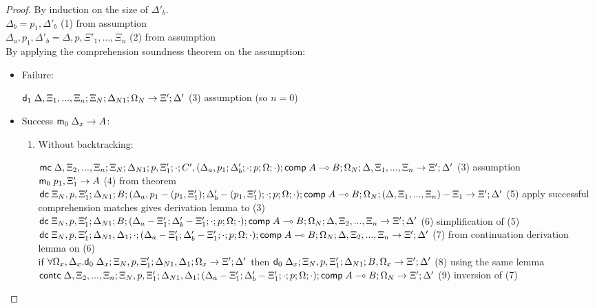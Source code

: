 \begin{proof}
   By induction on the size of $\Delta'_b$.\\

   $\Delta_b = p_1, \Delta'_b$ \hfill (1) from assumption \\
   $\Delta_a, p_1, \Delta'_b = \Delta, p, \Xi'_1, ..., \Xi_n$ \hfill (2) from assumption \\
   By applying the comprehension soundness theorem on the assumption:\\
      
   \begin{itemize}
      \item Failure:
         
      $\mathsf{d}_1 \; \Delta, \Xi_1, ..., \Xi_n; \Xi_N; \Delta_{N1}; \Omega_N \rightarrow \Xi'; \Delta'$ \hfill (3) assumption (so $n = 0$)\\
         
      \item Success $\mathsf{m}_0 \; \Delta_x \rightarrow A$:
      
      \begin{enumerate}
         
         \item Without backtracking:
         
         $\mathsf{mc} \; \Delta, \Xi_2, ..., \Xi_n; \Xi_N; \Delta_{N1}; p, \Xi'_1; \cdot; C', (\Delta_a, p_1; \Delta'_b; \cdot; p; \Omega; \cdot); \mathsf{comp} \; A \multimap B; \Omega_N; \Delta, \Xi_1, ..., \Xi_n \rightarrow \Xi'; \Delta'$ \hfill (3) assumption \\
         $\mathsf{m}_0 \; p_1, \Xi'_1 \rightarrow A$ \hfill (4) from theorem\\
         $\mathsf{dc} \; \Xi_N, p, \Xi'_1; \Delta_{N1}; B; (\Delta_a, p_1 - (p_1, \Xi'_1); \Delta'_b - (p_1, \Xi'_1); \cdot; p; \Omega; \cdot); \mathsf{comp} \; A \multimap B; \Omega_N; (\Delta, \Xi_1, ..., \Xi_n) - \Xi_1 \rightarrow \Xi'; \Delta'$ \hfill (5) apply successful comprehension matches gives derivation lemma to (3) \\
         $\mathsf{dc} \; \Xi_N, p, \Xi'_1; \Delta_{N1}; B; (\Delta_a - \Xi'_1; \Delta'_b - \Xi'_1; \cdot; p; \Omega; \cdot); \mathsf{comp} \; A \multimap B; \Omega_N; \Delta, \Xi_2, ..., \Xi_n \rightarrow \Xi'; \Delta'$ \hfill (6) simplification of (5) \\
         $\mathsf{dc} \; \Xi_N, p, \Xi'_1; \Delta_{N1}, \Delta_1; \cdot; (\Delta_a - \Xi'_1; \Delta'_b - \Xi'_1; \cdot; p; \Omega; \cdot); \mathsf{comp} \; A \multimap B; \Omega_N; \Delta, \Xi_2, ..., \Xi_n \rightarrow \Xi'; \Delta'$ \hfill (7) from continuation derivation lemma on (6)\\
         if $\forall \Omega_x, \Delta_x. \mathsf{d}_0 \; \Delta_x; \Xi_N, p, \Xi'_1; \Delta_{N1}, \Delta_1; \Omega_x \rightarrow \Xi'; \Delta'$ then $\mathsf{d}_0 \; \Delta_x; \Xi_N, p, \Xi'_1; \Delta_{N1}; B, \Omega_x \rightarrow \Xi'; \Delta'$ \hfill (8) using the same lemma \\
         $\mathsf{contc} \; \Delta, \Xi_2, ..., \Xi_n; \Xi_N, p, \Xi'_1; \Delta_{N1}, \Delta_1; (\Delta_a - \Xi'_1; \Delta'_b - \Xi'_1; \cdot; p; \Omega; \cdot); \mathsf{comp} \; A \multimap B; \Omega_N \rightarrow \Xi'; \Delta'$ \hfill (9) inversion of (7) \\   
      

\end{enumerate}
\end{itemize}
\end{proof}
